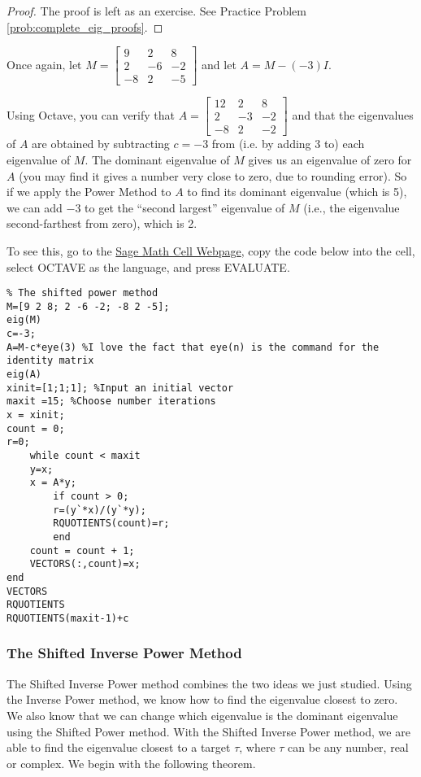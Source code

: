 \documentclass{ximera}
\begin{document}
\begin{proof}
The proof is left as an exercise.  See Practice Problem \ref{prob:complete_eig_proofs}.
\end{proof}

Once again, let $M=\left[ \begin{array}{rrr}
9 & 2 & 8 \\
2 & -6 & -2 \\
-8 & 2 & -5
\end{array}\right]$ and let $A=M - (-3)I$.

Using Octave, you can verify that $A=\left[ \begin{array}{rrr}
12 & 2 & 8 \\
2 & -3 & -2 \\
-8 & 2 & -2
\end{array}\right]$ and that the eigenvalues of $A$ are obtained by subtracting $c=-3$ from (i.e. by adding 3 to) each eigenvalue of $M$.  The dominant eigenvalue of $M$ gives us an eigenvalue of zero for $A$ (you may find it gives a number very close to zero, due to rounding error).  So if we apply the Power Method to $A$ to find its dominant eigenvalue (which is 5), we can add $-3$ to get the ``second largest'' eigenvalue of $M$ (i.e., the eigenvalue second-farthest from zero), which is 2.

To see this, go to the \href{https://sagecell.sagemath.org/}{Sage Math Cell Webpage}, copy the code below into the cell, select OCTAVE as the language, and press EVALUATE.

\begin{verbatim}
% The shifted power method
M=[9 2 8; 2 -6 -2; -8 2 -5];
eig(M)
c=-3;
A=M-c*eye(3) %I love the fact that eye(n) is the command for the identity matrix
eig(A)
xinit=[1;1;1]; %Input an initial vector
maxit =15; %Choose number iterations
x = xinit;
count = 0;
r=0;
    while count < maxit
    y=x;
    x = A*y;
        if count > 0; 
        r=(y`*x)/(y`*y);
        RQUOTIENTS(count)=r;
        end
    count = count + 1;
    VECTORS(:,count)=x;
end
VECTORS
RQUOTIENTS
RQUOTIENTS(maxit-1)+c
\end{verbatim}

\subsubsection*{The Shifted Inverse Power Method}

The Shifted Inverse Power method combines the two ideas we just studied.  Using the Inverse Power method, we know how to find the eigenvalue closest to zero.  We also know that we can change which eigenvalue is the dominant eigenvalue using the Shifted Power method.  With the Shifted Inverse Power method, we are able to find the eigenvalue closest to a target $\tau$, where $\tau$ can be any number, real or complex.    We begin with the following theorem.
\end{document}
